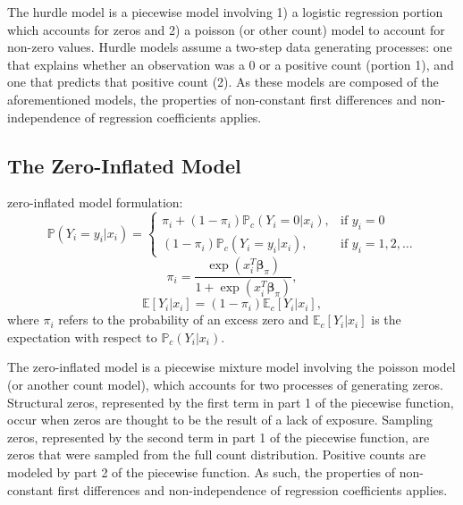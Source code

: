 \documentclass[jou, apacite]{apa6}
\begin{document}
The hurdle model is a piecewise model involving 1) a logistic regression portion which accounts for zeros and 2) a poisson (or other count) model to account for non-zero values. Hurdle models assume a two-step data generating processes: one that explains whether an observation was a 0 or a positive count (portion 1), and one that predicts that positive count (2). As these models are composed of the aforementioned models, the properties of non-constant first differences and non-independence of regression coefficients applies. 

\subsection{The Zero-Inflated Model}

zero-inflated model formulation:
\begin{equation}
\mathbb{P}(Y_i = y_i|x_i) =
  \begin{cases}
    \pi_i + (1 - \pi_i)\mathbb{P}_c(Y_i = 0|x_i), & \text{if } y_i = 0 \\
    (1 - \pi_i) \mathbb{P}_c(Y_i = y_i|x_i), & \text{if } y_i = 1, 2, \dots
  \end{cases}
\end{equation}
\begin{equation}
\pi_i = \dfrac{\exp (x_i^T \bm{\beta}_{\pi})}{1 + \exp (x_i^T \bm{\beta}_{\pi})},
\end{equation}
\begin{equation}
\mathbb{E}[Y_i|x_i] = (1 - \pi_i)\mathbb{E}_c[Y_i|x_i], %
\end{equation}
where $\pi_i$ refers to the probability of an excess zero and $\mathbb{E}_c[Y_i|x_i]$ is the expectation with respect to $\mathbb{P}_c(Y_i|x_i)$.

The zero-inflated model is a piecewise mixture model involving the poisson model (or another count model), which accounts for two processes of generating zeros. Structural zeros, represented by the first term in part 1 of the piecewise function, occur when zeros are thought to be the result of a lack of exposure. Sampling zeros, represented by the second term in part 1 of the piecewise function, are zeros that were sampled from the full count distribution. Positive counts are modeled by part 2 of the piecewise function. As such, the properties of non-constant first differences and non-independence of regression coefficients applies. 
\end{document}

